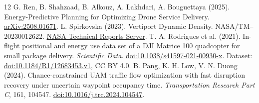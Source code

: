 \documentclass[11pt,a4paper]{article}
\begin{document}
\begin{thebibliography}{12}
 G. Ren, B. Shahzaad, B. Alkouz, A. Lakhdari, A. Bouguettaya (2025). Energy-Predictive Planning for Optimizing Drone Service Delivery. \href{https://arxiv.org/abs/2508.01671}{arXiv:2508.01671}.
 L. Spirkovska (2023). Vertiport Dynamic Density. NASA/TM--20230012622. \href{https://ntrs.nasa.gov/citations/20230012622}{NASA Technical Reports Server}.
 T. A. Rodrigues et al. (2021). In-flight positional and energy use data set of a DJI Matrice 100 quadcopter for small package delivery. \emph{Scientific Data}. \href{https://doi.org/10.1038/s41597-021-00930-x}{doi:10.1038/s41597-021-00930-x}. Dataset: \href{https://doi.org/10.1184/R1/12683453.v1}{doi:10.1184/R1/12683453.v1}, CC BY 4.0.
 B. Pang, K. H. Low, V. N. Duong (2024). Chance-constrained UAM traffic flow optimization with fast disruption recovery under uncertain waypoint occupancy time. \emph{Transportation Research Part C}, 161, 104547. \href{https://doi.org/10.1016/j.trc.2024.104547}{doi:10.1016/j.trc.2024.104547}.
\end{thebibliography}
\end{document}

